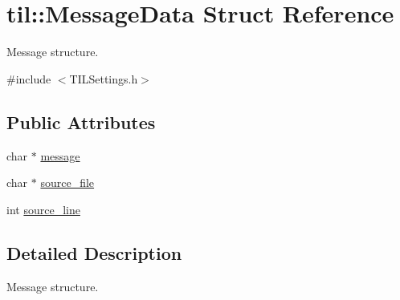 \hypertarget{structtil_1_1_message_data}{
\section{til::MessageData Struct Reference}
\label{structtil_1_1_message_data}
}


Message structure.  




{\ttfamily \#include $<$TILSettings.h$>$}

\subsection*{Public Attributes}
\begin{DoxyCompactItemize}
\item 
char $\ast$ \hyperlink{structtil_1_1_message_data_a509ca54f8bbc534d0220d3e7b1637a8d}{message}
\item 
char $\ast$ \hyperlink{structtil_1_1_message_data_a0e06be68ecffce75b5920a24d367bad7}{source\_\-file}
\item 
int \hyperlink{structtil_1_1_message_data_a431af7e6298fbf1d6a0cf4518d67d153}{source\_\-line}
\end{DoxyCompactItemize}


\subsection{Detailed Description}
Message structure. 

